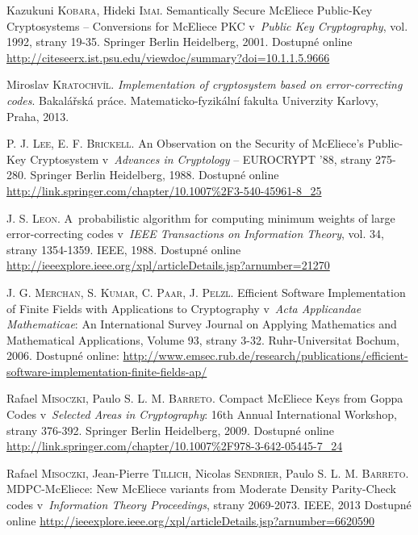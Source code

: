 \documentclass[thesis=M,czech,hidelinks]{FITthesis}[2012/06/26]
\newcommand{\0}{{\textcolor[gray]{0.80}{0}}}
\begin{document}
\begin{thebibliography}{99}
        Kazukuni \textsc{Kobara}, Hideki \textsc{Imai}. Semantically Secure
        McEliece Public-Key Cryptosystems -- Conversions for McEliece PKC
        v~\emph{Public Key Cryptography}, vol. 1992, strany 19-35. Springer
        Berlin Heidelberg, 2001. Dostupné online
        \url{http://citeseerx.ist.psu.edu/viewdoc/summary?doi=10.1.1.5.9666}

        Miroslav \textsc{Kratochvíl}. \emph{Implementation of cryptosystem based
        on error-correcting codes}. Bakalářská práce. Matematicko-fyzikální
        fakulta Univerzity Karlovy, Praha, 2013.

        P. J. \textsc{Lee}, E. F. \textsc{Brickell}. An Observation on the
        Security of McEliece's Public-Key Cryptosystem v~\emph{Advances in
        Cryptology} -- EUROCRYPT '88, strany 275-280. Springer Berlin
        Heidelberg, 1988. Dostupné online
        \url{http://link.springer.com/chapter/10.1007\%2F3-540-45961-8\_25}

        J. S. \textsc{Leon}. A~probabilistic algorithm for computing minimum
        weights of large error-correcting codes v~\emph{IEEE Transactions on
        Information Theory}, vol. 34, strany 1354-1359. IEEE, 1988. Dostupné
        online
        \url{http://ieeexplore.ieee.org/xpl/articleDetails.jsp?arnumber=21270}

        J. G. \textsc{Merchan}, S. \textsc{Kumar}, C. \textsc{Paar},
        J. \textsc{Pelzl}. Efficient Software Implementation of Finite
        Fields with Applications to Cryptography v~\emph{Acta Applicandae
        Mathematicae}: An International Survey Journal on Applying Mathematics
        and Mathematical Applications, Volume 93, strany  3-32.
        Ruhr-Universitat Bochum, 2006. Dostupné online:
        \url{http://www.emsec.rub.de/research/publications/efficient-software-implementation-finite-fields-ap/}

        Rafael \textsc{Misoczki}, Paulo S. L. M. \textsc{Barreto}. Compact
        McEliece Keys from Goppa Codes v~\emph{Selected Areas in Cryptography}:
        16th Annual International Workshop, strany 376-392. Springer Berlin
        Heidelberg, 2009. Dostupné online
        \url{http://link.springer.com/chapter/10.1007\%2F978-3-642-05445-7\_24}

        Rafael \textsc{Misoczki}, Jean-Pierre \textsc{Tillich}, Nicolas
        \textsc{Sendrier}, Paulo S. L. M. \textsc{Barreto}. MDPC-McEliece: New
        McEliece variants from Moderate Density Parity-Check codes
        v~\emph{Information Theory Proceedings}, strany 2069-2073. IEEE, 2013
        Dostupné online
        \url{http://ieeexplore.ieee.org/xpl/articleDetails.jsp?arnumber=6620590}


\end{thebibliography}
\end{document}
